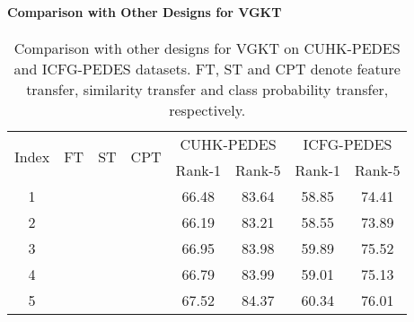\paragraph{Comparison with Other Designs for VGKT}
\begin{table}[t]
\renewcommand\arraystretch{1.06}
	\centering
		\caption{\small{Comparison with other designs for VGKT on CUHK-PEDES and ICFG-PEDES datasets. FT, ST and CPT denote feature transfer, similarity transfer and class probability transfer, respectively.}}
    \begin{tabular}{cccc|cc|cc}
    \hline
    \multirow{2}{*}{Index}&	\multirow{2}{*}{FT}& 		\multirow{2}{*}{ST}& \multirow{2}{*}{CPT} & \multicolumn{2}{c|}{CUHK-PEDES} & \multicolumn{2}{c}{ICFG-PEDES} \\  
&		&	  &  & Rank-1 & Rank-5 &Rank-1  & Rank-5 \\ \hline  \hline 
1&		\xmarkg &    \xmarkg  & \xmarkg &  66.48& 83.64  & 58.85 &74.41  \\
2&		\cmark &    \xmarkg  & \xmarkg &    66.19  & 83.21 & 58.55  & 73.89   \\
3&		\xmarkg&	 \cmark  & \xmarkg  &   66.95 & 83.98  &  59.89   &  75.52   \\
4&		\xmarkg&	 \xmarkg  & \cmark   &  66.79  &  83.99 & 59.01   &  75.13   \\
5&		\xmarkg&	 \cmark  & \cmark    &   67.52 & 84.37  &   60.34   &  76.01\\
	\hline
	\end{tabular}

	\label{tab:VGKT-variations}
\end{table}

